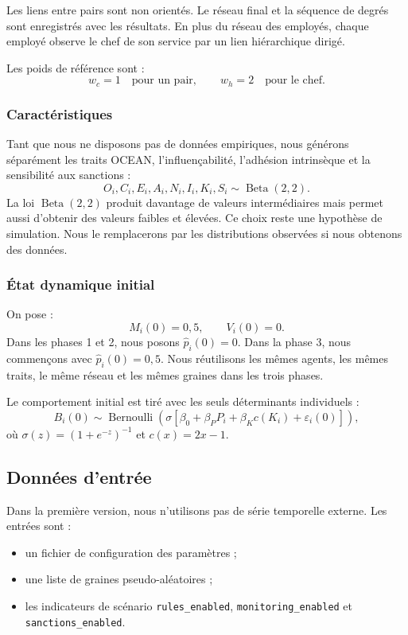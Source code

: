 \documentclass[11pt,a4paper]{article}
\newcommand{\code}[1]{\texttt{\small #1}}
\begin{document}
Les liens entre pairs sont non orientés. Le réseau final et la séquence de
degrés sont enregistrés avec les résultats. En plus du réseau des employés,
chaque employé observe le chef de son service par un lien hiérarchique dirigé.

Les poids de référence sont :
\[
w_c=1 \quad\text{pour un pair},\qquad
w_h=2 \quad\text{pour le chef}.
\]

\subsubsection{Caractéristiques}

Tant que nous ne disposons pas de données empiriques, nous générons séparément
les traits OCEAN, l’influençabilité, l’adhésion intrinsèque et la sensibilité aux
sanctions :
\[
O_i,C_i,E_i,A_i,N_i,I_i,K_i,S_i\sim\operatorname{Beta}(2,2).
\]
La loi $\operatorname{Beta}(2,2)$ produit davantage de valeurs intermédiaires
mais permet aussi d’obtenir des valeurs faibles et élevées. Ce choix reste une
hypothèse de simulation. Nous le remplacerons par les distributions observées
si nous obtenons des données.

\subsubsection{État dynamique initial}

On pose :
\[
M_i(0)=0{,}5,\qquad V_i(0)=0.
\]
Dans les phases 1 et 2, nous posons $\widehat p_i(0)=0$. Dans la phase 3, nous
commençons avec $\widehat p_i(0)=0{,}5$. Nous réutilisons les mêmes agents, les
mêmes traits, le même réseau et les mêmes graines dans les trois phases.

Le comportement initial est tiré avec les seuls déterminants individuels :
\[
B_i(0)\sim\operatorname{Bernoulli}\!\left(
\sigma\left[\beta_0+\beta_P P_i+\beta_Kc(K_i)+\varepsilon_i(0)\right]
\right),
\]
où $\sigma(z)=(1+e^{-z})^{-1}$ et $c(x)=2x-1$.

\subsection{Données d’entrée}

Dans la première version, nous n’utilisons pas de série temporelle externe. Les
entrées sont :

\begin{itemize}
  \item un fichier de configuration des paramètres ;
  \item une liste de graines pseudo-aléatoires ;
  \item les indicateurs de scénario
  \code{rules\_enabled}, \code{monitoring\_enabled} et
  \code{sanctions\_enabled}.
\end{itemize}
\end{document}
